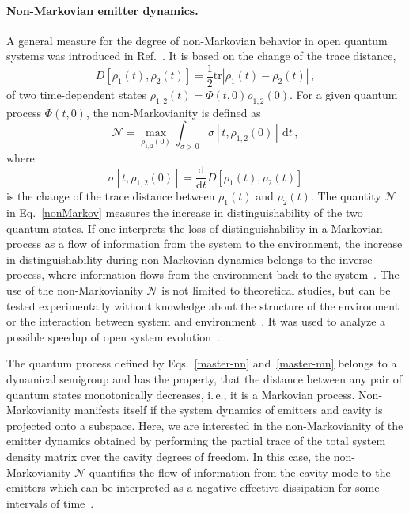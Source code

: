 \documentclass[aps,pra,twocolumn,showpacs,showkeys,10pt,nofootinbib]{revtex4-1}
\newcommand{\rmd}{\mathrm d}
\begin{document}
\paragraph*{Non-Markovian emitter dynamics.}
A general measure for the degree of non-Markovian behavior in open quantum systems was introduced in Ref.~\cite{blp09}.
It is based on the change of the trace distance,
\begin{equation}
  D[\rho_1(t), \rho_2(t)] = \frac{1}{2} \text{tr}|\rho_1(t) - \rho_2(t)| \,,
\end{equation}
of two time-dependent states $\rho_{1,2}(t)=\Phi(t,0)\rho_{1,2}(0)$.
For a given quantum process $\Phi(t,0)$, the non-Markovianity is defined as
\begin{equation}\label{nonMarkov}
  \mathcal{N} = \max_{\rho_{1,2}(0)} \int_{\sigma > 0} \sigma[t, \rho_{1,2}(0)] \, \rmd t \,,
\end{equation}
where
\begin{equation}
  \sigma[t, \rho_{1,2}(0)] = \frac{\rmd}{\rmd t} D[\rho_1(t), \rho_2(t)]
\end{equation}
is the change of the trace distance between $\rho_1(t)$ and $\rho_2(t)$.
The quantity $\mathcal{N}$ in Eq.~\eqref{nonMarkov} measures the increase in distinguishability of the two quantum states.
If one interprets the loss of distinguishability in a Markovian process as a flow of information from the system to the environment, the increase in distinguishability during non-Markovian dynamics belongs to the inverse process, where information flows from the environment back to the system~\cite{blp09}.
The use of the non-Markovianity $\mathcal{N}$ is not limited to theoretical studies, but can be tested experimentally without knowledge about the structure of the environment or the interaction between system and environment~\cite{lpb10}.
It was used to analyze a possible speedup of open system evolution~\cite{zxf16}.

The quantum process defined by Eqs.~\eqref{master-nn} and~\eqref{master-mn} belongs to a dynamical semigroup and has the property, that the distance between any pair of quantum states monotonically decreases, i.\,e., it is a Markovian process.
Non-Markovianity manifests itself if the system dynamics of emitters and cavity is projected onto a subspace.
Here, we are interested in the non-Markovianity of the emitter dynamics obtained by performing the partial trace of the total system density matrix over the cavity degrees of freedom.
In this case, the non-Markovianity $\mathcal{N}$ quantifies the flow of information from the cavity mode to the emitters which can be interpreted as a negative effective dissipation for some intervals of time~\cite{blp09}.
\end{document}
